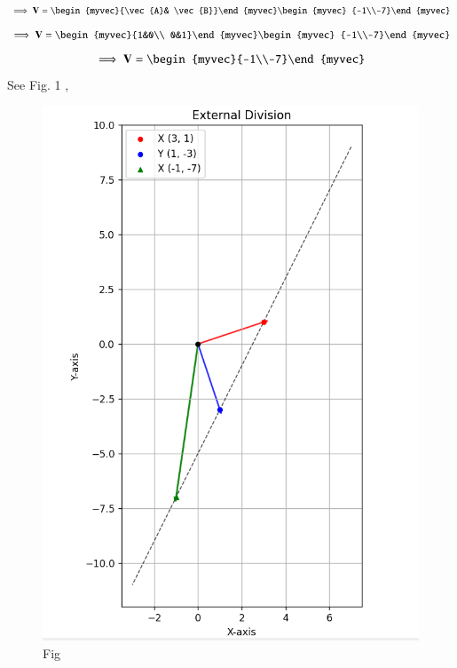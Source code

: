 \documentclass[journal]{IEEEtran}
\begin{document}
 \begin{align}
\implies \vec{V}=\begin{myvec}{\vec{A}& \vec{B}}\end{myvec}\begin{myvec}
        {-1\\-7}\end{myvec}\\
\end{align}  
\begin{align}
\implies \vec{V}=\begin{myvec}{1&0\\ 0&1}\end{myvec}\begin{myvec}
        {-1\\-7}\end{myvec}\\
\end{align}
\begin{align}
\implies \vec{V}=\begin{myvec}{-1\\-7}\end{myvec}
\end{align} 
See Fig. 1 ,
\begin{figure}[H]
\begin{center}
\includegraphics[width=0.6\columnwidth]{figs/fig.png}
\end{center}
\caption{Fig}
\label{fig:Fig1}
\end{figure}
\end{document}
